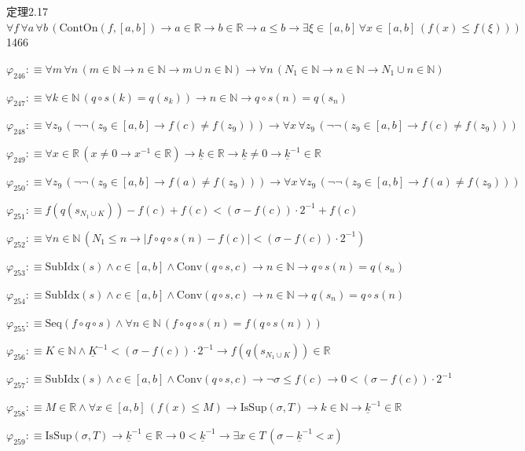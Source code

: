 \begin{fullproof}{定理2.17}{$\forall f\,\forall a\,\forall b\,(\mathrm{ContOn}(f,[a,b]) \to a \in \mathbb{R} \to b \in \mathbb{R} \to a \leq b \to \exists \xi \in [a,b]\,\forall x \in [a,b]\,(f(x) \leq f(\xi)))$}{1466}
\begin{abbrevlist}
\item $\varphi_{246} :\equiv \forall m\,\forall n\,(m \in \mathbb{N} \to n \in \mathbb{N} \to m \cup n \in \mathbb{N}) \to \forall n\,(N_{1} \in \mathbb{N} \to n \in \mathbb{N} \to N_{1} \cup n \in \mathbb{N})$
\item $\varphi_{247} :\equiv \forall k \in \mathbb{N}\,(q \circ s(k) = q(s_{k})) \to n \in \mathbb{N} \to q \circ s(n) = q(s_{n})$
\item $\varphi_{248} :\equiv \forall z_{9}\,(\neg \neg (z_{9} \in [a,b] \to f(c) \neq f(z_{9}))) \to \forall x\,\forall z_{9}\,(\neg \neg (z_{9} \in [a,b] \to f(c) \neq f(z_{9})))$
\item $\varphi_{249} :\equiv \forall x \in \mathbb{R}\,(x \neq 0 \to x^{-1} \in \mathbb{R}) \to \underline{k} \in \mathbb{R} \to \underline{k} \neq 0 \to \underline{k}^{-1} \in \mathbb{R}$
\item $\varphi_{250} :\equiv \forall z_{9}\,(\neg \neg (z_{9} \in [a,b] \to f(a) \neq f(z_{9}))) \to \forall x\,\forall z_{9}\,(\neg \neg (z_{9} \in [a,b] \to f(a) \neq f(z_{9})))$
\item $\varphi_{251} :\equiv f(q(s_{N_{1} \cup K})) - f(c) + f(c) < (\sigma - f(c)) \cdot 2^{-1} + f(c)$
\item $\varphi_{252} :\equiv \forall n \in \mathbb{N}\,(N_{1} \leq n \to \lvert f \circ q \circ s(n) - f(c) \rvert < (\sigma - f(c)) \cdot 2^{-1})$
\item $\varphi_{253} :\equiv \mathrm{SubIdx}(s) \land c \in [a,b] \land \mathrm{Conv}(q \circ s,c) \to n \in \mathbb{N} \to q \circ s(n) = q(s_{n})$
\item $\varphi_{254} :\equiv \mathrm{SubIdx}(s) \land c \in [a,b] \land \mathrm{Conv}(q \circ s,c) \to n \in \mathbb{N} \to q(s_{n}) = q \circ s(n)$
\item $\varphi_{255} :\equiv \mathrm{Seq}(f \circ q \circ s) \land \forall n \in \mathbb{N}\,(f \circ q \circ s(n) = f(q \circ s(n)))$
\item $\varphi_{256} :\equiv K \in \mathbb{N} \land \underline{K}^{-1} < (\sigma - f(c)) \cdot 2^{-1} \to f(q(s_{N_{1} \cup K})) \in \mathbb{R}$
\item $\varphi_{257} :\equiv \mathrm{SubIdx}(s) \land c \in [a,b] \land \mathrm{Conv}(q \circ s,c) \to \neg \sigma \leq f(c) \to 0 < (\sigma - f(c)) \cdot 2^{-1}$
\item $\varphi_{258} :\equiv M \in \mathbb{R} \land \forall x \in [a,b]\,(f(x) \leq M) \to \mathrm{IsSup}(\sigma,T) \to k \in \mathbb{N} \to \underline{k}^{-1} \in \mathbb{R}$
\item $\varphi_{259} :\equiv \mathrm{IsSup}(\sigma,T) \to \underline{k}^{-1} \in \mathbb{R} \to 0 < \underline{k}^{-1} \to \exists x \in T\,(\sigma - \underline{k}^{-1} < x)$

\end{abbrevlist}
\end{fullproof}
